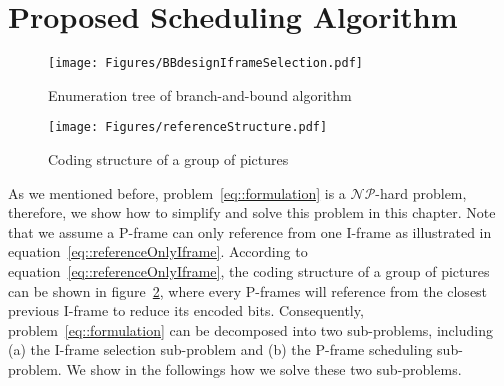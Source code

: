 \section{Proposed Scheduling Algorithm}
\label{sec::schedulingAlgorithm}
\begin{figure}
\begin{center}
\texttt{[image: Figures/BBdesignIframeSelection.pdf]}
\caption{\label{fig::BBdesgin}Enumeration tree of branch-and-bound algorithm}
\end{center}
\end{figure}
%
\begin{figure}
\begin{center}
\texttt{[image: Figures/referenceStructure.pdf]}
\caption{\label{fig::encodeOrder}Coding structure of a group of pictures}
\end{center}
\end{figure}
As we mentioned before, problem~\eqref{eq::formulation} is a $\mathcal{NP}$-hard problem, therefore, we show how to simplify and solve this problem in this chapter.
Note that we assume a P-frame can only reference from one I-frame as illustrated in equation~\eqref{eq::referenceOnlyIframe}.
According to equation~\eqref{eq::referenceOnlyIframe}, the coding structure of a group of pictures can be shown in figure~\ref{fig::encodeOrder}, where every P-frames will reference from the closest previous I-frame to reduce its encoded bits.
Consequently, problem~\eqref{eq::formulation} can be decomposed into two sub-problems, including (a) the I-frame selection sub-problem and (b) the P-frame scheduling sub-problem.
We show in the followings how we solve these two sub-problems.

